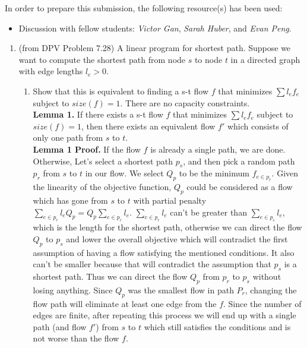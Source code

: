 \documentclass[letterpaper,12pt]{article}
\begin{document}
\pagestyle{fancy}

In order to prepare this submission, the following resource(s) has been used:
\begin{itemize}
	\item Discussion with fellow students: \textit{Victor Gan}, \textit{Sarah Huber}, and \textit{Evan Peng}.
\end{itemize}

\begin{enumerate}
\item (from DPV Problem 7.28) A linear program for shortest path. Suppose we want to compute the shortest path from node $s$ to node $t$ in a directed graph with edge lengths $l_e > 0$.

\begin{enumerate}
	\item Show that this is equivalent to finding a s-t flow $f$ that minimizes $\sum l_ef_e$ subject to $size(f) = 1$. There are no capacity constraints.\\
	\textbf{Lemma 1.} If there exists a s-t flow $f$ that minimizes $\sum l_ef_e$ subject to $size(f) = 1$, then there exists an equivalent flow $f'$ which consists of only one path from $s$ to $t$.\\
	\textbf{Lemma 1 Proof.} If the flow $f$ is already a single path, we are done. Otherwise, Let's select a shortest path $p_s$, and then pick a random path $p_r$ from $s$ to $t$ in our flow. We select $Q_p$ to be the minimum $f_{e\in{}p_r}$. Given the linearity of the objective function, $Q_p$ could be considered as a flow which has gone from $s$ to $t$ with partial penalty $\sum_{e\in{}p_r} l_eQ_p = Q_p \sum_{e\in{}p_r}l_e$. $\sum_{e\in{}p_r}l_e$ can't be greater than $\sum_{e\in{}p_s}l_e$, which is the length for the shortest path, otherwise we can direct the flow $Q_p$ to $p_s$ and lower the overall objective which will contradict the first assumption of having a flow satisfying the mentioned conditions. It also can't be smaller because that will contradict the assumption that $p_s$ is a shortest path. Thus we can direct the flow $Q_p$ from $p_r$ to $p_s$ without losing anything. Since $Q_p$ was the smallest flow in path $P_r$, changing the flow path will eliminate at least one edge from the $f$. Since the number of edges are finite, after repeating this process we will end up with a single path (and flow $f'$) from $s$ to $t$ which still satisfies the conditions and is not worse than the flow $f$.\\

\end{enumerate}
\end{enumerate}
\end{document}
